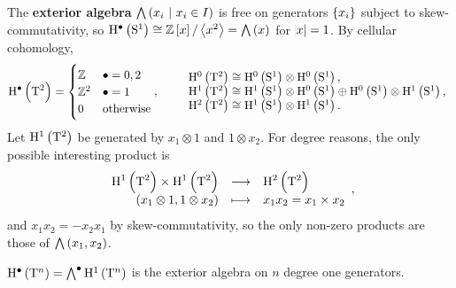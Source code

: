 \begin{example*}
The \textbf{exterior algebra} $ \ext\br{x_i \st x_i \in I} $ is free on generators $ \cbr{x_i} $ subject to skew-commutativity, so $ \H^\bullet\br{\S^1} \cong \ZZ\sbr{x} / \abr{x^2} = \ext\br{x} $ for $ \abs{x} = 1 $. By cellular cohomology,
$$ \H^\bullet\br{\T^2} =
\begin{cases}
\ZZ & \bullet = 0, 2 \\
\ZZ^2 & \bullet = 1 \\
0 & \text{otherwise}
\end{cases},
\qquad
\begin{array}{l}
\H^0\br{\T^2} \cong \H^0\br{\S^1} \otimes \H^0\br{\S^1}, \\
\H^1\br{\T^2} \cong \H^1\br{\S^1} \otimes \H^0\br{\S^1} \oplus \H^0\br{\S^1} \otimes \H^1\br{\S^1}, \\
\H^2\br{\T^2} \cong \H^1\br{\S^1} \otimes \H^1\br{\S^1}.
\end{array}
$$
Let $ \H^1\br{\T^2} $ be generated by $ x_1 \otimes 1 $ and $ 1 \otimes x_2 $. For degree reasons, the only possible interesting product is
$$ \function{\H^1\br{\T^2} \times \H^1\br{\T^2}}{\H^2\br{\T^2}}{\br{x_1 \otimes 1, 1 \otimes x_2}}{x_1x_2 = x_1 \times x_2}, $$
and $ x_1x_2 = -x_2x_1 $ by skew-commutativity, so the only non-zero products are those of $ \ext\br{x_1, x_2} $.
\end{example*}

\begin{corollary}
$ \H^\bullet\br{\T^n} = \ext^\bullet\H^1\br{\T^n} $ is the exterior algebra on $ n $ degree one generators.
\end{corollary}

